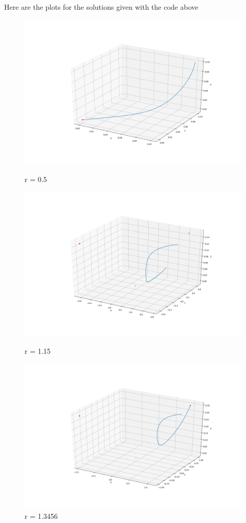 \documentclass[11pt, a4paper, reqno]{scrartcl}
\begin{document}
    	Here are the plots for the solutions given with the code above
        \begin{figure}
        	\includegraphics[scale = 0.25]{plot_0.png}
            \caption{r = 0.5}
            \includegraphics[scale = 0.25]{plot_1.png}
            \caption{r = 1.15}
            \includegraphics[scale = 0.25]{plot_2.png}
            \caption{r = 1.3456}
        \end{figure}
\end{document}
